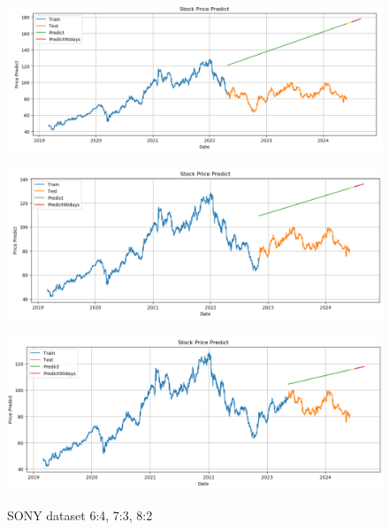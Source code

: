 \documentclass[conference]{IEEEtran}
\begin{document}
\begin{figure}[H]
    \centering
    \begin{minipage}{0.15\textwidth}
    \centering
    \includegraphics[width=1\textwidth]{Image/Linear/Linear_SONY_6_4.png}
   
    \label{fig:1}
    \end{minipage}%
    \begin{minipage}{0.15\textwidth}
    \centering
    \includegraphics[width=1\textwidth]{Image/Linear/Linear_SONY_7_3.png}
  
    \label{fig:2}
    \end{minipage}%
    \begin{minipage}{0.15\textwidth}
    \centering
    \includegraphics[width=1\textwidth]{Image/Linear/Linear_SONY_8_2.png}

    \label{fig:3}
    \end{minipage}
    \caption{SONY dataset 6:4, 7:3, 8:2 }
\end{figure}
\end{document}
